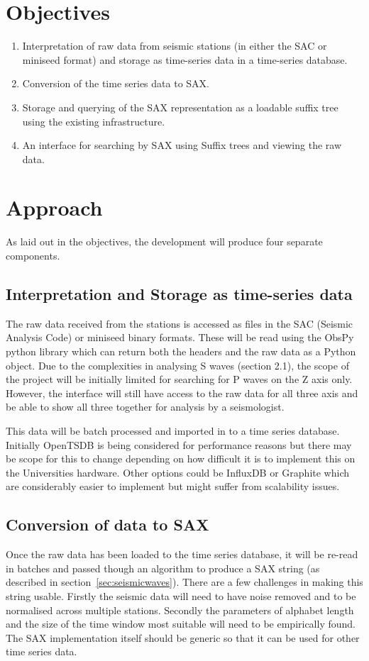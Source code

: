 \documentclass[11pt, a4paper]{scrartcl}
\begin{document}
\section{Objectives}
\begin{enumerate}
	\item Interpretation of raw data from seismic stations (in either the SAC or miniseed format) and storage as time-series data in a time-series database.
	\item Conversion of the time series data to SAX.
	\item Storage and querying of the SAX representation as a loadable suffix tree using the existing infrastructure.
	\item An interface for searching by SAX using Suffix trees and viewing the raw data.
\end{enumerate}

\section{Approach}
	As laid out in the objectives, the development will produce four separate components.
	
\subsection{Interpretation and Storage as time-series data}
	The raw data received from the stations is accessed as files in the SAC (Seismic Analysis Code) or miniseed binary formats.  These will be read using the ObsPy python library which can return both the headers and the raw data as a Python object.  Due to the complexities in analysing S waves (section 2.1), the scope of the project will be initially limited for searching for P waves on the Z axis only.  However, the interface will still have access to the raw data for all three axis and be able to show all three together for analysis by a seismologist.
	
	This data will be batch processed and imported in to a time series database.  Initially OpenTSDB is being considered for performance reasons but there may be scope for this to change depending on how difficult it is to implement this on the Universities hardware.  Other options could be InfluxDB or Graphite which are considerably easier to implement but might suffer from scalability issues.

\subsection{Conversion of data to SAX}
	Once the raw data has been loaded to the time series database, it will be re-read in batches and passed though an algorithm to produce a SAX string (as described in section~\ref{sec:seismicwaves}).  There are a few challenges in making this string usable.  Firstly the seismic data will need to have noise removed and to be normalised across multiple stations.  Secondly the parameters of alphabet length and the size of the time window most suitable will need to be empirically found.  The SAX implementation itself should be generic so that it can be used for other time series data.
	
\end{document}

